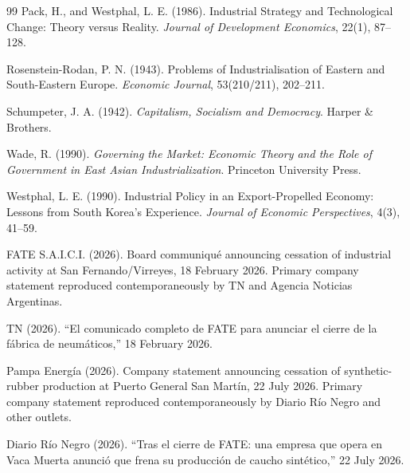 \begin{thebibliography}{99}
Pack, H., and Westphal, L. E. (1986).
Industrial Strategy and Technological Change: Theory versus Reality.
\emph{Journal of Development Economics}, 22(1), 87--128.

Rosenstein-Rodan, P. N. (1943).
Problems of Industrialisation of Eastern and South-Eastern Europe.
\emph{Economic Journal}, 53(210/211), 202--211.

Schumpeter, J. A. (1942).
\emph{Capitalism, Socialism and Democracy}.
Harper \& Brothers.

Wade, R. (1990).
\emph{Governing the Market: Economic Theory and the Role of Government in East Asian Industrialization}.
Princeton University Press.

Westphal, L. E. (1990).
Industrial Policy in an Export-Propelled Economy: Lessons from South Korea's Experience.
\emph{Journal of Economic Perspectives}, 4(3), 41--59.

FATE S.A.I.C.I. (2026).
Board communiqu\'e announcing cessation of industrial activity at San Fernando/Virreyes, 18 February 2026.
Primary company statement reproduced contemporaneously by TN and Agencia Noticias Argentinas.

TN (2026).
``El comunicado completo de FATE para anunciar el cierre de la f\'abrica de neum\'aticos,'' 18 February 2026.

Pampa Energ\'ia (2026).
Company statement announcing cessation of synthetic-rubber production at Puerto General San Mart\'in, 22 July 2026.
Primary company statement reproduced contemporaneously by Diario R\'io Negro and other outlets.

Diario R\'io Negro (2026).
``Tras el cierre de FATE: una empresa que opera en Vaca Muerta anunci\'o que frena su producci\'on de caucho sint\'etico,'' 22 July 2026.

\end{thebibliography}
